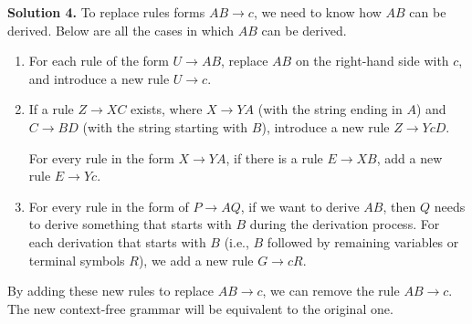 \documentclass[12pt]{article}
\newcommand{\solution}[1]{\noindent \textbf{Solution #1.}}
\begin{document}
\solution{4}
To replace rules forms $AB \rightarrow c$, we need to know how \( AB \) can be derived. Below are all the cases in which \( AB \) can be derived. 

\begin{enumerate}

  \item For each rule of the form \( U \rightarrow AB \), replace \( AB \) on the right-hand side with \( c \), and introduce a new rule \( U \rightarrow c \).

  \item If a rule \( Z \rightarrow XC \) exists, where \( X \rightarrow YA \) (with the string ending in \( A \)) and \( C \rightarrow BD \) (with the string starting with \( B \)), introduce a new rule \( Z \rightarrow YcD \).

  For every rule in the form \( X \rightarrow YA \), if there is a rule \( E \rightarrow XB \), add a new rule \( E \rightarrow Yc \).


  \item For every rule in the form of \( P \rightarrow AQ \), if we want to derive \( AB \), then \( Q \) needs to derive something that starts with \( B \) during the derivation process. For each derivation that starts with \( B \) (i.e., \( B \) followed by remaining variables or terminal symbols \( R \)), we add a new rule \( G \rightarrow cR \).
\end{enumerate}


By adding these new rules to replace \( AB \rightarrow c \), we can remove the rule \( AB \rightarrow c \). The new context-free grammar will be equivalent to the original one.
\end{document}
